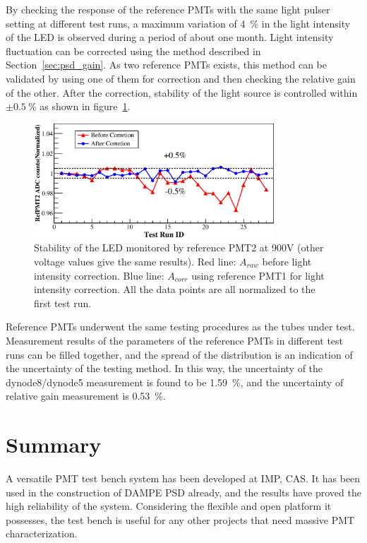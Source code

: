 \documentclass{JINST}
\begin{document}
By checking the response of the reference PMTs with the same light pulser setting at different test runs, a maximum variation of \SI{4}{\percent} in the light intensity of the LED is observed during a period of about one month.
Light intensity fluctuation can be corrected using the method described in Section~\ref{sec:psd_gain}.
As two reference PMTs exists, this method can be validated by using one of them for correction and then checking the relative gain of the other. 
After the correction, stability of the light source is controlled within $\pm\SI{0.5}{\percent}$ as shown in figure~\ref{fig:FIG8}.
	
\begin{figure}[tbp]
	\centering
	\includegraphics[width=90mm]{FIG8}
	\caption{Stability of the LED monitored by reference PMT2 at 900V (other voltage values give the same results). Red line: $A_{raw}$ before light intensity correction. Blue line: $A_{corr}$ using reference PMT1 for light intensity correction. All the data points are all normalized to the first test run. }
	\label{fig:FIG8}
\end{figure} 
	
Reference PMTs underwent the same testing procedures as the tubes under test.
Measurement results of the parameters of the reference PMTs in different test runs can be filled together, and the spread of the distribution is an indication of the uncertainty of the testing method.
In this way, the uncertainty of the dynode8/dynode5 measurement is found to be \SI{1.59}{\percent}, and the uncertainty of relative gain measurement is \SI{0.53}{\percent}. 
	
\section{Summary}
\label{sec:summary}
A versatile PMT test bench system has been developed at IMP, CAS.
It has been used in the construction of DAMPE PSD already, and the results have proved the high reliability of the system.
Considering the flexible and open platform it possesses, the test bench is useful for any other projects that need massive PMT characterization. 
\end{document}

